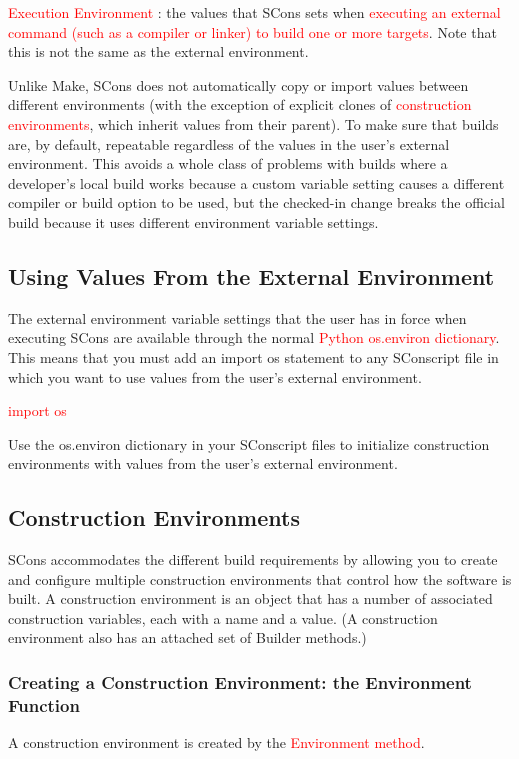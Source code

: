 \documentclass[12pt,a4paper]{article}
\begin{document}
\textcolor{red}{Execution Environment} : the values that SCons sets when \textcolor{red}{executing an external command (such as a compiler or linker) to build one or more targets}. Note that this is not the same as the external environment.

Unlike Make, SCons does not automatically copy or import values between different environments (with the exception of explicit clones of \textcolor{red}{construction environments}, which inherit values from their parent). To make sure that builds are, by default, repeatable regardless of the values in the user's external environment. This avoids a whole class of problems with builds where a developer's local build works because a custom variable setting causes a different compiler or build option to be used, but the checked-in change breaks the official build because it uses different environment variable settings.

\subsection{Using Values From the External Environment}
The external environment variable settings that the user has in force when executing SCons are available through the normal \textcolor{red}{Python os.environ dictionary}. This means that you must add an import os statement to any SConscript file in which you want to use values from the user's external environment.

\textcolor{red}{import os}

Use the os.environ dictionary in your SConscript files to initialize construction environments with values from the user's external environment.

\subsection{Construction Environments}
SCons accommodates the different build requirements by allowing you to create and configure multiple construction environments that control how the software is built. A construction environment is an object that has a number of associated construction variables, each with a name and a value. (A construction environment also has an attached set of Builder methods.)

\subsubsection{Creating a Construction Environment: the Environment Function}
A construction environment is created by the \textcolor{red}{Environment method}.
\end{document}

